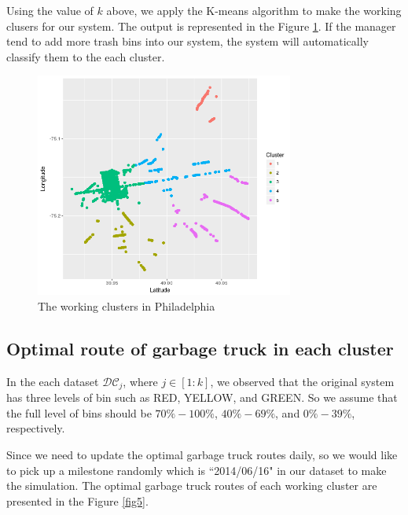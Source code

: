 \documentclass[conference,compsoc]{IEEEtran}
\begin{document}
 \par Using the value of $k$ above, we apply the K-means algorithm to make the working clusers for our system. The output is represented in the Figure \ref{fig4}. If the manager tend to add more trash bins into our system, the system will automatically classify them to the each cluster. 
 
  \begin{figure}
 	\centering
 	\includegraphics[width=8.5cm]{workingcluster}
 	\caption{The working clusters in Philadelphia}
 	\label{fig4}
 \end{figure}
 
 
  \subsection{Optimal route of garbage truck in each cluster}

In the each dataset $\mathcal{DC}_j$, where $j \in [1:k]$, we observed that the original system has three levels of bin such as RED, YELLOW, and GREEN. So we assume that the full level of bins should be $70\%-100\%$, $40\%-69\%$, and $0\%-39\%$, respectively.

\par Since we need to update the optimal garbage truck routes daily, so we would like to pick up a milestone randomly which is ``2014/06/16" in our dataset to make the simulation. The optimal garbage truck routes of each working cluster are presented in the Figure \ref{fig5}.
\end{document}
